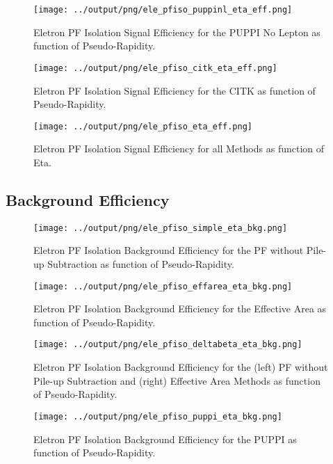 \documentclass[11pt]{book}
\begin{document}
\begin{figure}[htb]
\centering
\texttt{[image: ../output/png/ele\_pfiso\_puppinl\_eta\_eff.png]}
\caption{Eletron PF Isolation Signal Efficiency for the PUPPI No Lepton as function of Pseudo-Rapidity.}
\label{fig:ele_pfiso_eta_eff_puppinl}
\end{figure}

\begin{figure}[htb]
\centering
\texttt{[image: ../output/png/ele\_pfiso\_citk\_eta\_eff.png]}
\caption{Eletron PF Isolation Signal Efficiency for the CITK as function of Pseudo-Rapidity.}
\label{fig:ele_pfiso_eta_eff_citk}
\end{figure}

\begin{figure}[htb]
\centering
\texttt{[image: ../output/png/ele\_pfiso\_eta\_eff.png]}
\caption{Eletron PF Isolation Signal Efficiency for all Methods as function of Eta.}
\label{fig:ele_pfiso_eta_eff}
\end{figure}
\clearpage

\subsection{Background Efficiency}
\begin{figure}[htb]
\centering
\texttt{[image: ../output/png/ele\_pfiso\_simple\_eta\_bkg.png]}
\caption{Eletron PF Isolation Background Efficiency for the PF without Pile-up Subtraction as function of Pseudo-Rapidity.}
\label{fig:ele_pfiso_eta_bkg_simple}
\end{figure}

\begin{figure}[htb]
\centering
\texttt{[image: ../output/png/ele\_pfiso\_effarea\_eta\_bkg.png]}
\caption{Eletron PF Isolation Background Efficiency for the Effective Area as function of Pseudo-Rapidity.}
\label{fig:ele_pfiso_eta_bkg_effarea}
\end{figure}

\begin{figure}[htb]
\centering
\texttt{[image: ../output/png/ele\_pfiso\_deltabeta\_eta\_bkg.png]}
\caption{Eletron PF Isolation Background Efficiency for the (left) PF without Pile-up Subtraction and (right) Effective Area Methods as function of Pseudo-Rapidity.}
\label{fig:ele_pfiso_eta_bkg_deltabeta}
\end{figure}

\begin{figure}[htb]
\centering
\texttt{[image: ../output/png/ele\_pfiso\_puppi\_eta\_bkg.png]}
\caption{Eletron PF Isolation Background Efficiency for the PUPPI as function of Pseudo-Rapidity.}
\label{fig:ele_pfiso_eta_bkg_puppi}
\end{figure}
\end{document}
